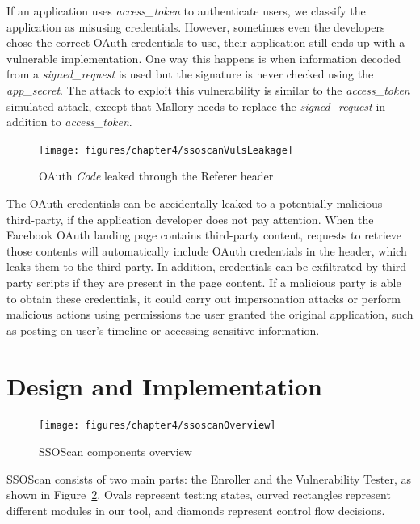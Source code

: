   If an application uses \emph{access\_token} to authenticate users, we classify the application as misusing credentials.  However, sometimes even the developers chose the correct OAuth credentials to use, their application still ends up with a vulnerable implementation.  One way this happens is when information decoded from a \emph{signed\_request} is used but the signature is never checked using the \emph{app\_secret}.  The attack to exploit this vulnerability is similar to the \emph{access\_token} simulated attack, except that Mallory needs to replace the \emph{signed\_request} in addition to \emph{access\_token}.

\begin{figure}[hbt]
\centering
\texttt{[image: figures/chapter4/ssoscanVulsLeakage]}
\caption{OAuth \emph{Code} leaked through the Referer header}
\label{fig:ssoscanVulsLeakage}
\end{figure}

  The OAuth credentials can be accidentally leaked to a potentially malicious third-party, if the application developer does not pay attention.  When the Facebook OAuth landing page contains third-party content, requests to retrieve those contents will automatically include OAuth credentials in the  header, which leaks them to the third-party.  In addition, credentials can be exfiltrated by third-party scripts if they are present in the page content.  If a malicious party is able to obtain these credentials, it could carry out impersonation attacks or perform malicious actions using permissions the user granted the original application, such as posting on user's timeline or accessing sensitive information.

\section{Design and Implementation}
\label{sec:ssoscanDesign}

\begin{figure}[hbt]
\centering
\texttt{[image: figures/chapter4/ssoscanOverview]}
\caption{SSOScan components overview}
\label{fig:ssoscanOverview}
\end{figure}

SSOScan consists of two main parts: the Enroller and the Vulnerability Tester, as shown in Figure~\ref{fig:ssoscanOverview}.  Ovals represent testing states, curved rectangles represent different modules in our tool, and diamonds represent control flow decisions.  

